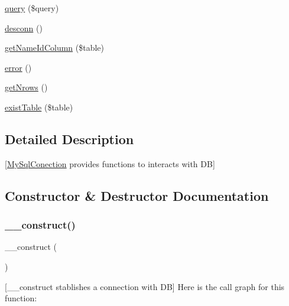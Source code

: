 \begin{DoxyCompactItemize}
\mbox{\hyperlink{class_my_sql_conection_ac9fddec3f6bd1db128887a1b211d90f0}{query}} (\$query)
\item 
\mbox{\hyperlink{class_my_sql_conection_a0a967d2f64e8c8ea51389e9dafb50d75}{desconn}} ()
\item 
\mbox{\hyperlink{class_my_sql_conection_af40dd57b52816d36d041b95cc08dba05}{get\+Name\+Id\+Column}} (\$table)
\item 
\mbox{\hyperlink{class_my_sql_conection_a43b8d30b879d4f09ceb059b02af2bc02}{error}} ()
\item 
\mbox{\hyperlink{class_my_sql_conection_a9b6d440558c6276d62ea45b6727a8b32}{get\+Nrows}} ()
\item 
\mbox{\hyperlink{class_my_sql_conection_a421b3316d3ece1b6d8ba968488939ff9}{exist\+Table}} (\$table)
\end{DoxyCompactItemize}


\subsection{Detailed Description}
\mbox{[}\mbox{\hyperlink{class_my_sql_conection}{My\+Sql\+Conection}} provides functions to interacts with DB\mbox{]} 

\subsection{Constructor \& Destructor Documentation}
\mbox{\label{class_my_sql_conection_a095c5d389db211932136b53f25f39685}} 
\subsubsection{\texorpdfstring{\+\_\+\+\_\+construct()}{\_\_construct()}\hspace{0.1cm}{\footnotesize\ttfamily [1/2]}}
{\footnotesize\ttfamily \+\_\+\+\_\+construct (\begin{DoxyParamCaption}{ }\end{DoxyParamCaption})}

\mbox{[}\+\_\+\+\_\+construct stablishes a connection with DB\mbox{]} Here is the call graph for this function\+:
\mbox{\label{class_my_sql_conection_a421831a265621325e1fdd19aace0c758}} 
